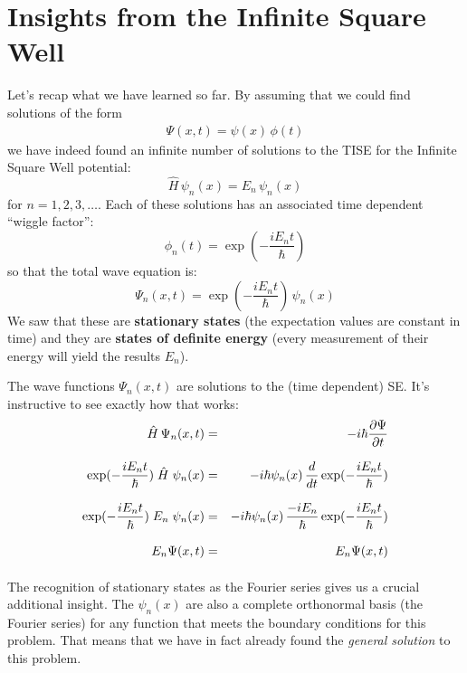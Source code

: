 \documentclass[12pt]{book}
\begin{document}
\section{Insights from the Infinite Square Well}

Let's recap what we have learned so far.  By assuming that we could find solutions of the form
\begin{eqnarray*}
\Psi(x,t) = \psi(x) \, \phi(t)
\end{eqnarray*}
we have indeed found an infinite number of solutions to the TISE for the Infinite Square Well potential:
\begin{equation*}
\hat{H} \, \psi_n(x) = E_n \, \psi_n(x)
\end{equation*}
for $n=1,2,3,\dots$. Each of these solutions has an associated time dependent ``wiggle factor'':
\begin{equation*}
\phi_n(t) = \exp(-\frac{i E_n t}{\hbar})
\end{equation*}
so that the total wave equation is:
\begin{equation*}
\Psi_n(x,t) = \exp(-\frac{i E_n t}{\hbar}) \, \psi_n(x)
\end{equation*}
We saw that these are {\bf stationary states} (the expectation values are constant in time) and they are {\bf states of definite energy} (every measurement of their energy will yield the results $E_n$).

The wave functions $\Psi_n(x,t)$ are solutions to the (time dependent) SE.  It's instructive to see exactly how that works:
\begin{eqnarray*}
\hat{H} \, \Psi_n(x,t) &=& -i \hbar \frac{\partial\Psi}{\partial t}\\[8pt]
\exp(-\frac{i E_n t}{\hbar}) \; \hat{H} \; \psi_n(x) &=& -i \hbar \psi_n(x) \, \frac{d}{dt}
\exp(-\frac{i E_n t}{\hbar})\\[8pt]
\exp(-\frac{i E_n t}{\hbar}) \; E_n \; \psi_n(x) &=& -i \hbar \psi_n(x) \, \frac{-iE_n}{\hbar}
\exp(-\frac{i E_n t}{\hbar})\\[8pt]
E_n \Psi(x,t) &=& E_n \Psi(x,t)\\[8pt]
\end{eqnarray*}
The recognition of stationary states as the Fourier series gives us a crucial additional insight.  The $\psi_n(x)$ are also a complete orthonormal basis (the Fourier series) for any function that meets the boundary conditions for this problem.  That means that we have in fact already found the {\em general solution} to this problem.
\end{document}

